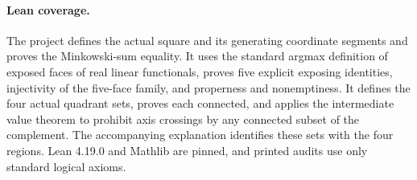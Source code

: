 \documentclass[11pt]{article}
\begin{document}
\paragraph{Lean coverage.}
The project defines the actual square and its generating coordinate
segments and proves the Minkowski-sum equality. It uses the standard
argmax definition of exposed faces of real linear functionals, proves
five explicit exposing identities, injectivity of the five-face
family, and properness and nonemptiness. It defines the four actual
quadrant sets, proves each connected, and applies the intermediate
value theorem to prohibit axis crossings by any connected subset
of the complement. The accompanying explanation identifies these
sets with the four regions. Lean 4.19.0 and Mathlib are pinned, and
printed audits use only standard logical axioms.
\end{document}
